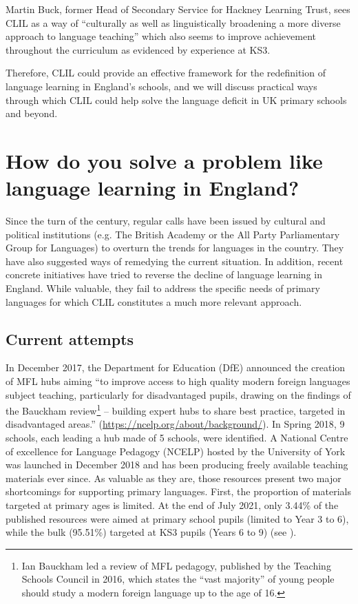 \documentclass[output=paper]{langscibook}
\begin{document}
Martin Buck, former Head of Secondary Service for Hackney Learning Trust, sees CLIL as a way of ``culturally as well as linguistically broadening a more diverse approach to language teaching'' which also seems to improve achievement throughout the curriculum as evidenced by  experience at KS3. 

Therefore, CLIL could provide an effective framework for the redefinition of language learning in England’s schools, and we will discuss practical ways through which CLIL could help solve the language deficit in UK primary schools and beyond.

\section{How do you solve a problem like language learning in England?}

Since the turn of the century, regular calls have been issued by cultural and political institutions (e.g. The British Academy or the All Party Parliamentary Group for Languages) to overturn the trends for languages in the country. They have also suggested ways of remedying the current situation. In addition, recent concrete initiatives have tried to reverse the decline of language learning in England. While valuable, they fail to address the specific needs of primary languages for which CLIL constitutes a much more relevant approach.

\subsection{Current attempts}

In {December 2017}, the Department for Education (DfE) announced the creation of MFL hubs aiming ``to improve access to high quality modern foreign languages subject teaching, particularly for disadvantaged pupils, drawing on the findings of the Bauckham review\footnote{Ian Bauckham led a review of MFL pedagogy, published by the Teaching Schools Council in 2016, which states the “vast majority” of young people should study a modern foreign language up to the age of 16.} -- building expert hubs to share best practice, targeted in disadvantaged areas.'' (\url{https://ncelp.org/about/background/}). In {Spring 2018}, 9 schools, each leading a hub made of 5 schools, were identified. A National Centre of excellence for Language Pedagogy (NCELP) hosted by the University of York was launched in  {December 2018} and has been producing freely available teaching materials ever since. As valuable as they are, those resources present two major shortcomings for supporting primary languages. First, the proportion of materials targeted at primary ages is limited. At the end of {July 2021}, only 3.44\% of the published resources were aimed at primary school pupils (limited to Year 3 to 6), while the bulk (95.51\%) targeted at KS3 pupils (Years 6 to 9) (see ).
\end{document}
